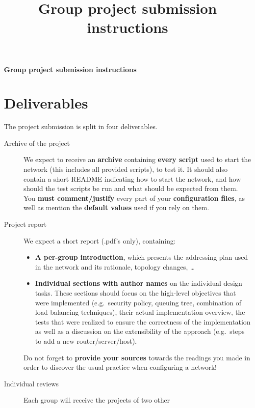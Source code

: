 \documentclass[a4paper,12pt]{article}
\def\mytitle{Group project submission instructions}\title{\mytitle}
\begin{document}
\rmfamily %
\pagestyle{fancy} %

\begin{center}
    \huge\bfseries\mytitle%
    \vspace{1ex}
\end{center} %

\section{Deliverables}
The project submission is split in four deliverables.
\begin{description}
    \item[Archive of the project] We expect to receive
        an \textbf{archive} containing \textbf{every script} used to start the network (this
        includes all provided scripts), to test it. It should also contain a
        short README indicating how to start the network, and how should the
        test scripts be run and what should be expected from them.
        You \textbf{must comment/justify} every part of your \textbf{configuration
        files}, as well as mention the \textbf{default values} used if you rely
        on them.
    \item[Project report] We expect a short report (.pdf's only), containing:
        \begin{itemize}
            \item \textbf{A per-group introduction}, which presents the addressing plan
                used in the network and its rationale, topology
                changes, \dots 
            \item \textbf{Individual sections with author names}
                on the individual design tasks. These sections should focus on
                the high-level objectives that were implemented (e.g.\ security
                policy, queuing tree, combination of load-balancing
                techniques), their actual implementation overview, the tests
                that were realized to ensure the correctness of the
                implementation as well as a discussion on the extensibility of
                the approach (e.g.\ steps to add a new router/server/host).
        \end{itemize}
        Do not forget to \textbf{provide your sources} towards the readings you made in
        order to discover the usual practice when configuring a network!
    \item[Individual reviews] Each group will receive the projects of two other

\end{description}
\end{document}

